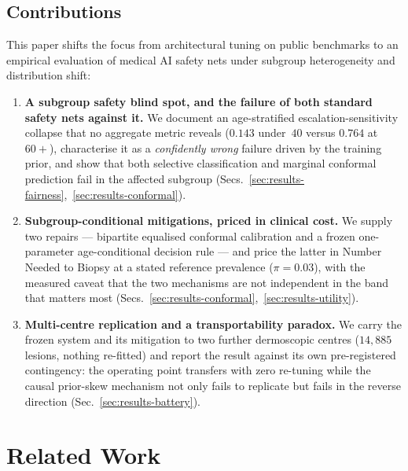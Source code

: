 \documentclass[journal]{IEEEtran}
\begin{document}
\subsection{Contributions}
This paper shifts the focus from architectural tuning on public benchmarks to an empirical
evaluation of medical AI safety nets under subgroup heterogeneity and distribution shift:

\begin{enumerate}
\item \textbf{A subgroup safety blind spot, and the failure of both standard safety nets
against it.} We document an age-stratified escalation-sensitivity collapse that no aggregate
metric reveals ($0.143$ under~$40$ versus $0.764$ at $60+$), characterise it as a
\emph{confidently wrong} failure driven by the training prior, and show that both selective
classification and marginal conformal prediction fail in the affected subgroup
(Secs.~\ref{sec:results-fairness},~\ref{sec:results-conformal}).
\item \textbf{Subgroup-conditional mitigations, priced in clinical cost.} We supply two
repairs --- bipartite equalised conformal calibration and a frozen one-parameter
age-conditional decision rule --- and price the latter in Number Needed to Biopsy at a stated
reference prevalence ($\pi=0.03$), with the measured caveat that the two mechanisms are not
independent in the band that matters most
(Secs.~\ref{sec:results-conformal},~\ref{sec:results-utility}).
\item \textbf{Multi-centre replication and a transportability paradox.} We carry the frozen
system and its mitigation to two further dermoscopic centres ($14{,}885$ lesions, nothing
re-fitted) and report the result against its own pre-registered contingency: the operating
point transfers with zero re-tuning while the causal prior-skew mechanism not only fails to
replicate but fails in the reverse direction (Sec.~\ref{sec:results-battery}).
\end{enumerate}

\section{Related Work}
\end{document}
